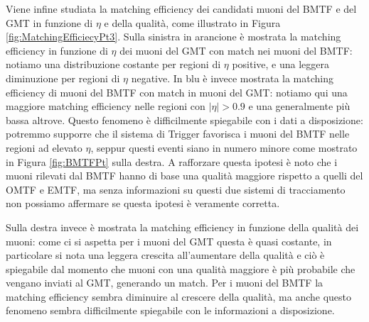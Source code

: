 Viene infine studiata la matching efficiency dei candidati muoni del BMTF e del GMT in funzione di $\eta$ e della qualità, come illustrato in Figura \ref{fig:MatchingEfficiecyPt3}. Sulla sinistra in arancione è mostrata la matching efficiency in funzione di $\eta$ dei muoni del GMT con match nei muoni del BMTF: notiamo una distribuzione costante per regioni di $\eta$ positive, e una leggera diminuzione per regioni di $\eta$ negative. In blu è invece mostrata la matching efficiency di muoni del BMTF con match in muoni del GMT: notiamo qui una maggiore matching efficiency nelle regioni con $|\eta| > 0.9$ e una generalmente più bassa altrove. \newline
Questo fenomeno è difficilmente spiegabile con i dati a disposizione: potremmo supporre che il sistema di Trigger favorisca i muoni del BMTF nelle regioni ad elevato $\eta$, seppur questi eventi siano in numero minore come mostrato in Figura \ref{fig:BMTFPt} sulla destra. A rafforzare questa ipotesi è noto che i muoni rilevati dal BMTF hanno di base una qualità maggiore rispetto a quelli del OMTF e EMTF, ma senza informazioni su questi due sistemi di tracciamento non possiamo affermare se questa ipotesi è veramente corretta.

Sulla destra invece è mostrata la matching efficiency in funzione della qualità dei muoni: come ci si aspetta per i muoni del GMT questa è quasi costante, in particolare si nota una leggera crescita all'aumentare della qualità e ciò è spiegabile dal momento che muoni con una qualità maggiore è più probabile che vengano inviati al GMT, generando un match. Per i muoni del BMTF la matching efficiency sembra diminuire al crescere della qualità, ma anche questo fenomeno sembra difficilmente spiegabile con le informazioni a disposizione.



